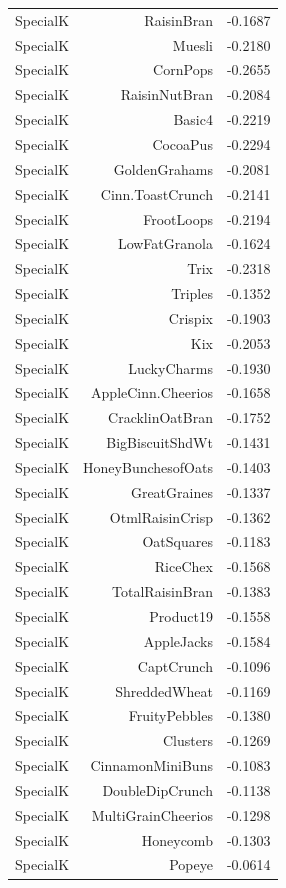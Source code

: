 \begin{longtable}{@{}lrr@{}}
SpecialK & RaisinBran & -0.1687 \\
SpecialK & Muesli & -0.2180 \\
SpecialK & CornPops & -0.2655 \\
SpecialK & RaisinNutBran & -0.2084 \\
SpecialK & Basic4 & -0.2219 \\
SpecialK & CocoaPus & -0.2294 \\
SpecialK & GoldenGrahams & -0.2081 \\
SpecialK & Cinn.ToastCrunch & -0.2141 \\
SpecialK & FrootLoops & -0.2194 \\
SpecialK & LowFatGranola & -0.1624 \\
SpecialK & Trix & -0.2318 \\
SpecialK & Triples & -0.1352 \\
SpecialK & Crispix & -0.1903 \\
SpecialK & Kix & -0.2053 \\
SpecialK & LuckyCharms & -0.1930 \\
SpecialK & AppleCinn.Cheerios & -0.1658 \\
SpecialK & CracklinOatBran & -0.1752 \\
SpecialK & BigBiscuitShdWt & -0.1431 \\
SpecialK & HoneyBunchesofOats & -0.1403 \\
SpecialK & GreatGraines & -0.1337 \\
SpecialK & OtmlRaisinCrisp & -0.1362 \\
SpecialK & OatSquares & -0.1183 \\
SpecialK & RiceChex & -0.1568 \\
SpecialK & TotalRaisinBran & -0.1383 \\
SpecialK & Product19 & -0.1558 \\
SpecialK & AppleJacks & -0.1584 \\
SpecialK & CaptCrunch & -0.1096 \\
SpecialK & ShreddedWheat & -0.1169 \\
SpecialK & FruityPebbles & -0.1380 \\
SpecialK & Clusters & -0.1269 \\
SpecialK & CinnamonMiniBuns & -0.1083 \\
SpecialK & DoubleDipCrunch & -0.1138 \\
SpecialK & MultiGrainCheerios & -0.1298 \\
SpecialK & Honeycomb & -0.1303 \\
SpecialK & Popeye & -0.0614 \\

\end{longtable}
